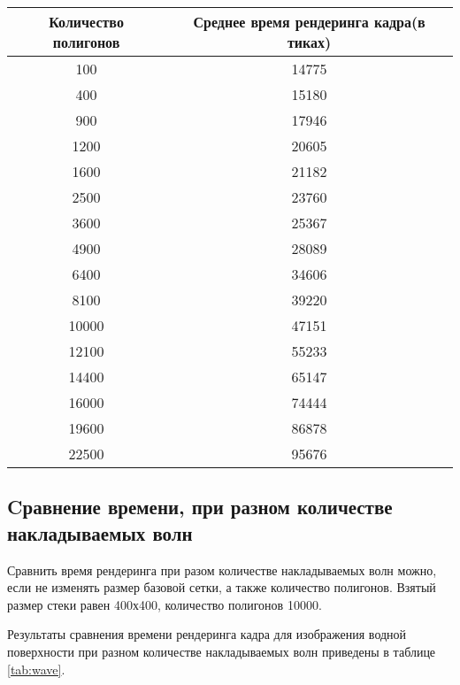 \begin{table}[h!]
	\caption{}
	\label{tab:polygons}
	\begin{center}
		\begin{tabular}{|c | c|} 
			\hline
			Количество полигонов & Среднее время рендеринга кадра(в тиках) \\  
			\hline
			100 & 14775  \\
			\hline
			400 &  15180 \\
			\hline
			900 &  17946 \\
			\hline
			1200 & 20605  \\
			\hline
			1600 &  21182  \\
			\hline
			2500 &  23760  \\
			\hline
			3600 &  25367 \\
			\hline
			4900 & 28089  \\
			\hline
			6400 &  34606 \\
			\hline
			8100 &  39220 \\
			\hline
			10000 & 47151 \\
			\hline
			12100 & 55233  \\
			\hline
			14400 & 65147  \\
			\hline
			16000 & 74444  \\
			\hline
			19600 & 86878  \\
			\hline
			22500 & 95676  \\
			\hline
		\end{tabular}
	\end{center}
\end{table}

\newpage

\subsection{Cравнение времени, при разном количестве накладываемых волн}


Сравнить время рендеринга при разом количестве накладываемых волн можно, если не изменять размер базовой сетки, а также количество полигонов. Взятый размер стеки равен 400х400, количество полигонов 10000.

Результаты сравнения времени рендеринга кадра для изображения водной поверхности при разном количестве накладываемых волн приведены в таблице \ref{tab:wave}.

